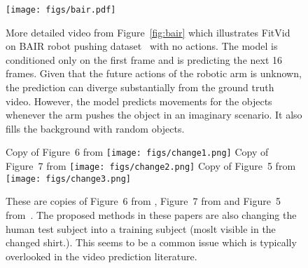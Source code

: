 \documentclass{article}
\newcommand{\model}{FitVid\xspace}
\begin{document}
\begin{landscape}
    \begin{figure}
        \texttt{[image: figs/bair.pdf]}
        \caption{More detailed video from Figure~\ref{fig:bair} which illustrates \model on BAIR robot pushing dataset~\cite{2017arXiv171005268E} with no actions. The model is conditioned only on the first frame and is predicting the next 16 frames. Given that the future actions of the robotic arm is unknown, the prediction can diverge substantially from the ground truth video. However, the model predicts movements for the objects whenever the arm pushes the object in an imaginary scenario. It also fills the background with random objects.}
        \label{fig:bair_full}
    \end{figure}

\end{landscape}

\begin{figure}
  \centering
  Copy of Figure~6 from \citet{franceschi2020stochastic}
  \texttt{[image: figs/change1.png]}
  Copy of Figure~7 from \citet{villegas2019high}
  \texttt{[image: figs/change2.png]}
  Copy of Figure~5 from~\citet{villegas2017learning}
  \texttt{[image: figs/change3.png]}
  
  \caption{These are copies of Figure~6 from \citet{franceschi2020stochastic}, Figure~7 from \citet{villegas2019high} and Figure~5 from~\citet{villegas2017learning}. The proposed methods in these papers are also changing the human test subject into a training subject (moslt visible in the changed shirt.). This seems to be a common issue which is typically overlooked in the video prediction literature.}
  \label{fig:otherpapers}
\end{figure}
\end{document}
